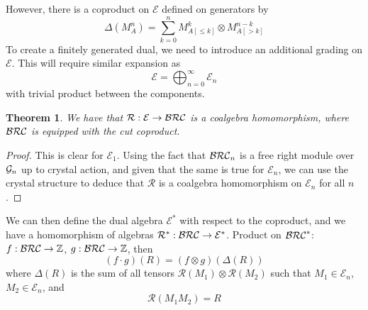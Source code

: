 \documentclass{amsart}
\newtheorem{theorem}{Theorem}[section]
\theoremstyle{definition}
\theoremstyle{remark}
\numberwithin{equation}{subsection}
\DeclareMathOperator{\sch}{\mathfrak{S}}
\begin{document}
However, there is a coproduct on $\mathcal{E}$ defined on generators by
$$\Delta(M_A^n) = \sum_{k=0}^n M_{A[\leq k]}^k \otimes M_{A[>k]}^{n-k}$$
To create a finitely generated dual, we need to introduce an additional grading on $\mathcal{E}$. This will require similar expansion as
$$\mathcal{E}=\bigoplus_{n=0}^\infty \mathcal{E}_n$$
with trivial product between the components. 
\begin{theorem}
We have that $\mathcal{R}:\mathcal{E}\to \mathcal{BRC}$ is a coalgebra homomorphism, where $\mathcal{BRC}$ is equipped with the cut coproduct. 
\end{theorem}
\begin{proof}
This is clear for $\mathcal{E}_1$. Using the fact that $\mathcal{BRC}_n$ is a free right module over $\mathcal{G}_n$ up to crystal action, and given that the same is true for $\mathcal{E}_n$, we can use the crystal structure to deduce that $\mathcal{R}$ is a coalgebra homomorphism on $\mathcal{E}_n$ for all $n$.
\end{proof}

We can then define the dual algebra $\mathcal{E}^*$ with respect to the coproduct, and we have a homomorphism of algebras $\mathcal{R}^*:\mathcal{BRC}\to \mathcal{E}^*$.
Product on $\mathcal{BRC}^*$: $f:\mathcal{BRC}\to \mathbb{Z}$, $g:\mathcal{BRC}\to \mathbb{Z}$, then
$$(f\cdot g)(R) = (f\otimes g)(\Delta(R))$$
where $\Delta(R)$ is the sum of all tensors $\mathcal{R}(M_1)\otimes \mathcal{R}(M_2)$ such that $M_1\in \mathcal{E}_n$, $M_2\in \mathcal{E}_n$, and
$$\mathcal{R}(M_1M_2) = R$$




\end{document}
